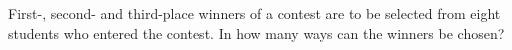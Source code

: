 First-, second- and third-place winners of a contest are to be selected from eight students who entered the contest. In how many ways can the winners be chosen?

